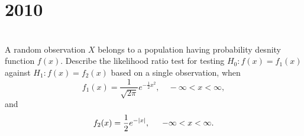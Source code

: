 \section*{2010}
\vspace{-.5cm}
\hrulefill \smallskip\\
 A random observation $X$ belongs to a population having probability desnity function $f(x)$. Describe the likelihood ratio test for testing $H_0 : f(x)=f_1(x)$ against $H_1: f(x) = f_2(x)$ based on a single observation, when
\[ f_1(x) = \frac{1}{\sqrt{2\pi}}e^{-\frac{1}{2}x^2}, \quad -\infty < x < \infty,\]
and
\[ f_2(x) = \frac{1}{2}e^{-|x|}, \quad\enskip -\infty < x < \infty.\]

